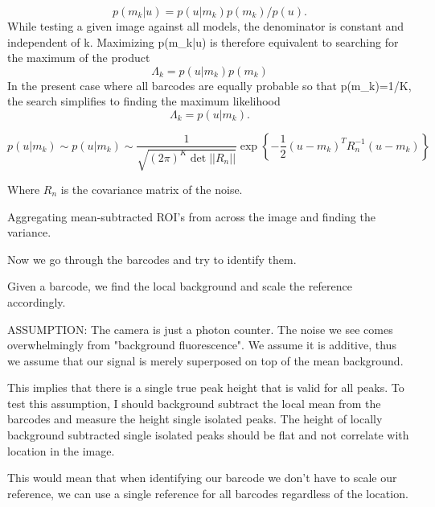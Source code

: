 \begin{equation}
p(m_k|u) = p(u|m_k)p(m_k)/p(u).
\end{equation}
While testing a given image against all models, the denominator is constant and independent of k. Maximizing p(m_k|u) is therefore equivalent to searching for the maximum of the product
\begin{equation}
\Lambda_k = p(u|m_k)p(m_k)
\end{equation}
In the present case where all barcodes are equally probable so that
p(m_k)=1/K, 
the search simplifies to finding the maximum likelihood 
\begin{equation}
\Lambda_k = p(u|m_k).
\end{equation}



\begin{equation}
p(u|m_k)\sim p(u|m_k) \sim \frac{1}{  \sqrt{ (2\pi)^K \det || R_n||} } \exp\left\{ -\frac{1}{2}  (u-m_k)^T R_n^{-1} (u-m_k) \right\}
\end{equation}

Where $R_{n}$ is the covariance matrix of the noise.




Aggregating mean-subtracted ROI's from across the image and finding the variance.

Now we go through the barcodes and try to identify them.

Given a barcode, we find the local background and scale the reference accordingly. 

ASSUMPTION: The camera is just a photon counter. The noise we see comes overwhelmingly from "background fluorescence". We assume it is additive, thus we assume that our signal is merely superposed on top of the mean background. 

This implies that there is a single true peak height that is valid for all peaks. To test this assumption, I should background subtract the local mean from the barcodes and measure the height single isolated peaks. The height of locally background subtracted single isolated peaks should be flat and not correlate with location in the image.

This would mean that when identifying our barcode we don't have to scale our reference, we can use a single reference for all barcodes regardless of the location.


